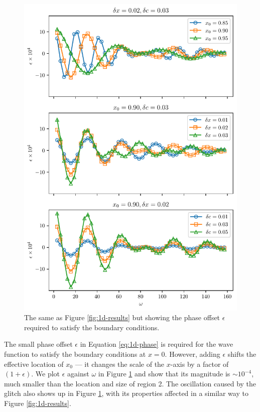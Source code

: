 \begin{figure}[!tbp]
    \centering
    \includegraphics{figures/glitch-1d-example-phase.pdf}
    \caption{The same as Figure \ref{fig:1d-results} but showing the phase offset \(\epsilon\) required to satisfy the boundary conditions.}
    \label{fig:1d-phase}
\end{figure}

The small phase offset \(\epsilon\) in Equation \ref{eq:1d-phase} is required for the wave function to satisfy the boundary conditions at \(x = 0\). However, adding \(\epsilon\) shifts the effective location of \(x_0\) --- it changes the scale of the \(x\)-axis by a factor of \((1 + \epsilon)\). We plot \(\epsilon\) against \(\omega\) in Figure \ref{fig:1d-phase} and show that its magnitude is \(\sim 10^{-4}\), much smaller than the location and size of region 2. The oscillation caused by the glitch also shows up in Figure \ref{fig:1d-phase}, with its properties affected in a similar way to Figure \ref{fig:1d-results}.

